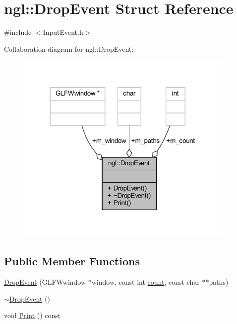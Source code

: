\hypertarget{structngl_1_1_drop_event}{}\section{ngl\+:\+:Drop\+Event Struct Reference}
\label{structngl_1_1_drop_event}


{\ttfamily \#include $<$Input\+Event.\+h$>$}



Collaboration diagram for ngl\+:\+:Drop\+Event\+:
\nopagebreak
\begin{figure}[H]
\begin{center}
\leavevmode
\includegraphics[width=300pt]{structngl_1_1_drop_event__coll__graph}
\end{center}
\end{figure}
\subsection*{Public Member Functions}
\begin{DoxyCompactItemize}
\item 
\mbox{\hyperlink{structngl_1_1_drop_event_ab62f900b8a1178a69962a34495b67aba}{Drop\+Event}} (G\+L\+F\+Wwindow $\ast$window, const int \mbox{\hyperlink{namespacengl_a5b20ff50635da5e3adb6bec00c062497ae2942a04780e223b215eb8b663cf5353}{count}}, const char $\ast$$\ast$paths)
\item 
\mbox{\hyperlink{structngl_1_1_drop_event_a36815d916c0efc4f1958631804131763}{$\sim$\+Drop\+Event}} ()
\item 
void \mbox{\hyperlink{structngl_1_1_drop_event_a1eb9c1f557be3980d58600051fe18d10}{Print}} () const
\end{DoxyCompactItemize}
